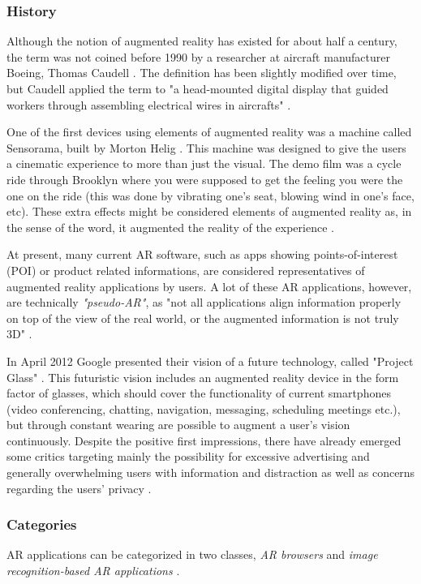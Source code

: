 \documentclass[12pt,journal,compsoc]{IEEEtran}
\begin{document}
\subsubsection{History}
Although the notion of augmented reality has existed for about half a century, the term was not coined before 1990 by a researcher at aircraft manufacturer Boeing, Thomas Caudell \cite{Olsson2011a}. The definition has been slightly modified over time, but Caudell applied the term to "a head-mounted digital display that guided workers through assembling electrical wires in aircrafts" \cite{wiredAR}.

One of the first devices using elements of augmented reality was a machine called Sensorama, built by Morton Helig \cite{HeligVR}. This machine was designed to give the users a cinematic experience to more than just the visual. The demo film was a cycle ride through Brooklyn where you were supposed to get the feeling you were the one on the ride (this was done by vibrating one’s seat, blowing wind in one’s face, etc).  These extra effects might be considered elements of augmented reality as, in the sense of the word, it augmented the reality of the experience \cite{pocketARhistory}.

At present, many current AR software, such as apps showing points-of-interest (POI) or product related informations, are considered representatives of augmented reality applications by users. A lot of these AR applications, however, are technically \textit{"pseudo-AR"}, as "not all applications align information properly on top of the view of the real world, or the augmented information is not truly 3D" \cite{Olsson2011a}. 

In April 2012 Google presented their vision of a future technology, called "Project Glass" \cite{ProjectGlass}. This futuristic vision includes an augmented reality device in the form factor of glasses, which should cover the functionality of current smartphones (video conferencing, chatting, navigation, messaging, scheduling meetings etc.), but through constant wearing are possible to augment a user’s vision continuously. Despite the positive first impressions, there have already emerged some critics targeting mainly the possibility for excessive advertising and generally overwhelming users with information and distraction as well as concerns regarding the users’ privacy \cite{GPGabcnews, GPGwashingtonpost}.


\subsubsection{Categories}
AR applications can be categorized in two classes, \textit{AR browsers} and \textit{image recognition-based AR applications} \cite{Olsson2011a}. 
\end{document}
